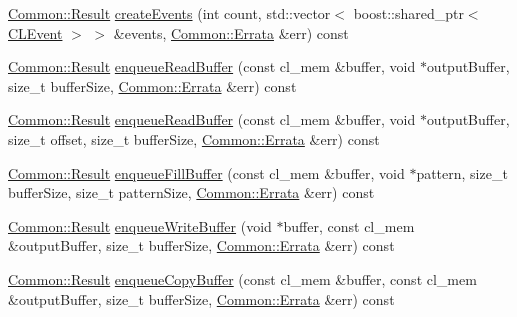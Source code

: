 \begin{DoxyCompactItemize}
\item 
\hyperlink{_errata_8h_a389396702f1aff6e71eb21328b0775c1}{Common\+::\+Result} \hyperlink{class_c_l_ray_tracer_1_1_open_c_l_utils_1_1_c_l_execution_context_a3370232aafe19ac17dc63cee8b8f5e42}{create\+Events} (int count, std\+::vector$<$ boost\+::shared\+\_\+ptr$<$ \hyperlink{class_c_l_ray_tracer_1_1_open_c_l_utils_1_1_c_l_event}{C\+L\+Event} $>$ $>$ \&events, \hyperlink{class_c_l_ray_tracer_1_1_common_1_1_errata}{Common\+::\+Errata} \&err) const 
\item 
\hyperlink{_errata_8h_a389396702f1aff6e71eb21328b0775c1}{Common\+::\+Result} \hyperlink{class_c_l_ray_tracer_1_1_open_c_l_utils_1_1_c_l_execution_context_ac7c1bf6d6ada5d4104e7d96dd0b15b8b}{enqueue\+Read\+Buffer} (const cl\+\_\+mem \&buffer, void $\ast$output\+Buffer, size\+\_\+t buffer\+Size, \hyperlink{class_c_l_ray_tracer_1_1_common_1_1_errata}{Common\+::\+Errata} \&err) const 
\item 
\hyperlink{_errata_8h_a389396702f1aff6e71eb21328b0775c1}{Common\+::\+Result} \hyperlink{class_c_l_ray_tracer_1_1_open_c_l_utils_1_1_c_l_execution_context_a8b5f64a7d034773c60e39a6f280ea9b9}{enqueue\+Read\+Buffer} (const cl\+\_\+mem \&buffer, void $\ast$output\+Buffer, size\+\_\+t offset, size\+\_\+t buffer\+Size, \hyperlink{class_c_l_ray_tracer_1_1_common_1_1_errata}{Common\+::\+Errata} \&err) const 
\item 
\hyperlink{_errata_8h_a389396702f1aff6e71eb21328b0775c1}{Common\+::\+Result} \hyperlink{class_c_l_ray_tracer_1_1_open_c_l_utils_1_1_c_l_execution_context_a091a8577503ecdb380805b2ca7cc2102}{enqueue\+Fill\+Buffer} (const cl\+\_\+mem \&buffer, void $\ast$pattern, size\+\_\+t buffer\+Size, size\+\_\+t pattern\+Size, \hyperlink{class_c_l_ray_tracer_1_1_common_1_1_errata}{Common\+::\+Errata} \&err) const 
\item 
\hyperlink{_errata_8h_a389396702f1aff6e71eb21328b0775c1}{Common\+::\+Result} \hyperlink{class_c_l_ray_tracer_1_1_open_c_l_utils_1_1_c_l_execution_context_a45252fc7bbdf285418220b04abdb135e}{enqueue\+Write\+Buffer} (void $\ast$buffer, const cl\+\_\+mem \&output\+Buffer, size\+\_\+t buffer\+Size, \hyperlink{class_c_l_ray_tracer_1_1_common_1_1_errata}{Common\+::\+Errata} \&err) const 
\item 
\hyperlink{_errata_8h_a389396702f1aff6e71eb21328b0775c1}{Common\+::\+Result} \hyperlink{class_c_l_ray_tracer_1_1_open_c_l_utils_1_1_c_l_execution_context_a1f9900b02109964463ce04ffa29153de}{enqueue\+Copy\+Buffer} (const cl\+\_\+mem \&buffer, const cl\+\_\+mem \&output\+Buffer, size\+\_\+t buffer\+Size, \hyperlink{class_c_l_ray_tracer_1_1_common_1_1_errata}{Common\+::\+Errata} \&err) const 

\end{DoxyCompactItemize}

